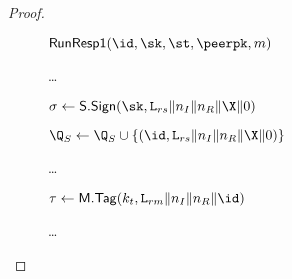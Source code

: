 \begin{proof}
\begin{collectinmacro}{\SIGMIProofSignatureMAC}{}{}
\begin{figure}[tp]
\begin{minipage}[t]{0.49\textwidth}
		\begin{oracle}{$\RunRespI(\id,\sk,\st,\peerpk,m)$}
			\item \dots
			\item $\sigma \gets \SIGScheme.\SIGSign(\sk,\labelrs\|\nonce_I\|\nonce_R\|\X\|\Y)$
			\item $\Q_{S} \gets \Q_{S} \cup \{(\id, \labelrs\|\nonce_I\|\nonce_R\|\X\|\Y)\}$
			\item \dots
			\item $\tau \gets \MACScheme.\MACTag(\kt, \labelrm\|\nonce_I\|\nonce_R\|\id)$
			\item {}
			\item \hindent {}
			\item \dots
		\end{oracle}


\end{minipage}
\end{figure}
\end{collectinmacro}
\end{proof}

